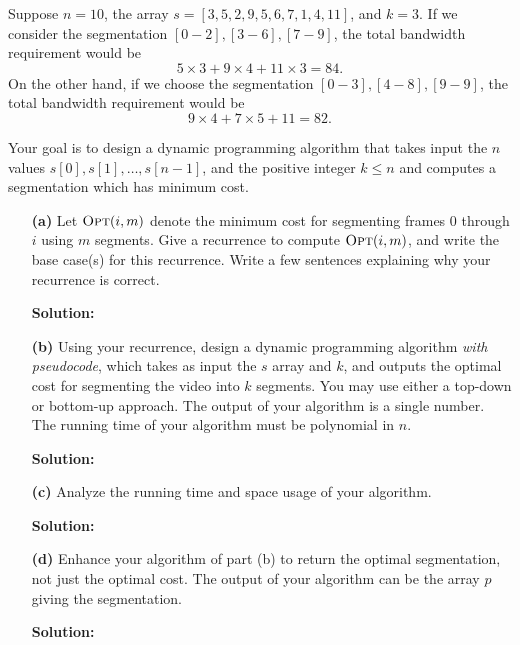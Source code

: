 \documentclass[11pt]{article}
\theoremstyle{definition}
\theoremstyle{theorem}
\newcommand{\opt}{\mbox{{\sc Opt}}}
\newcommand{\solution}[1]{{\medskip\noindent\color{DarkBlue}\textbf{Solution:} {#1}}}
\newcommand{\solution}[1]{}
\begin{document}
 Suppose $n = 10$, the array $s = [3, 5, 2, 9,
5, 6, 7, 1, 4, 11]$, and $k = 3$.  If we consider the segmentation
$[0-2], [3-6], [7-9]$, the total bandwidth requirement would be
\[
5 \times 3 + 9 \times 4 + 11 \times 3 = 84.
\]
On the other hand, if we choose the segmentation $[0-3], [4-8],
[9-9]$, the total bandwidth requirement would be
\[
9 \times 4 + 7 \times 5 + 11 = 82.
\]

Your goal is to design a dynamic programming algorithm that takes
input the $n$ values $s[0], s[1], \ldots, s[n-1]$, and the positive
integer $k \le n$ and computes a segmentation which has minimum cost.

\begin{itemize}
	\item[{\bf (a)}] Let $\opt(i,m)$ denote the minimum cost for
	segmenting frames $0$ through $i$ using $m$ segments.  Give a
	recurrence to compute $\opt(i,m)$, and write the base case(s) for
	this recurrence.  Write a few sentences explaining why your
	recurrence is correct.
	
	\solution{ 
	}
	
	\item[{\bf (b)}] Using your recurrence, design a dynamic programming
	algorithm {\em with pseudocode}, which takes as input the $s$ array and $k$, and outputs
	the optimal cost for segmenting the video into $k$ segments. You may
	use either a top-down or bottom-up approach.  The output of your
	algorithm is a single number.  The running time of your algorithm
	must be polynomial in $n$.
	
	\solution{
	}
	
	\item[{\bf (c)}] Analyze the running time and space usage of your algorithm.
	
	\solution{
	}
	
	\item[{\bf (d)}] Enhance your algorithm of part
	(b) to return the optimal segmentation, not just the optimal cost.
	The output of your algorithm can be the array $p$ giving the
	segmentation.
	
	\solution{ }
\end{itemize}
\end{document}
